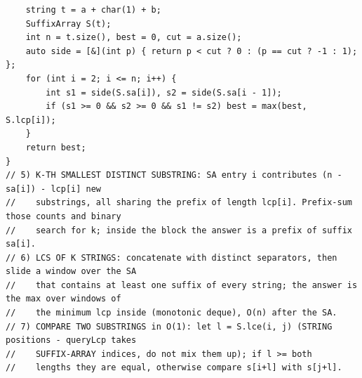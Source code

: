 \documentclass[9pt,a4paper,twocolumn]{extarticle}
\begin{document}
\begin{lstlisting}
    string t = a + char(1) + b;
    SuffixArray S(t);
    int n = t.size(), best = 0, cut = a.size();
    auto side = [&](int p) { return p < cut ? 0 : (p == cut ? -1 : 1); };
    for (int i = 2; i <= n; i++) {
        int s1 = side(S.sa[i]), s2 = side(S.sa[i - 1]);
        if (s1 >= 0 && s2 >= 0 && s1 != s2) best = max(best, S.lcp[i]);
    }
    return best;
}
// 5) K-TH SMALLEST DISTINCT SUBSTRING: SA entry i contributes (n - sa[i]) - lcp[i] new
//    substrings, all sharing the prefix of length lcp[i]. Prefix-sum those counts and binary
//    search for k; inside the block the answer is a prefix of suffix sa[i].
// 6) LCS OF K STRINGS: concatenate with distinct separators, then slide a window over the SA
//    that contains at least one suffix of every string; the answer is the max over windows of
//    the minimum lcp inside (monotonic deque), O(n) after the SA.
// 7) COMPARE TWO SUBSTRINGS in O(1): let l = S.lce(i, j) (STRING positions - queryLcp takes
//    SUFFIX-ARRAY indices, do not mix them up); if l >= both
//    lengths they are equal, otherwise compare s[i+l] with s[j+l].
\end{lstlisting}

\filbreak
\end{document}
